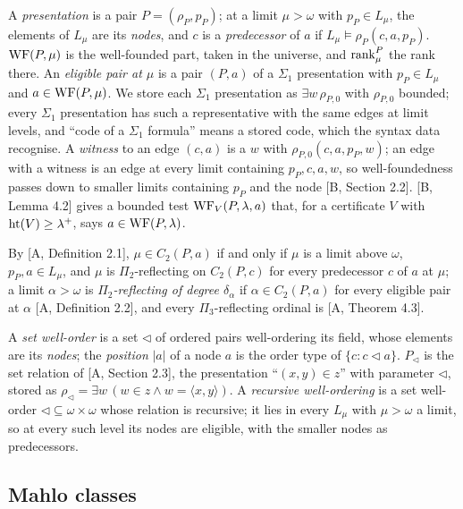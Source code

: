 \documentclass[11pt]{article}
\begin{document}
A \emph{presentation} is a pair $P = (\rho_P, p_P)$; at a limit $\mu > \omega$ with $p_P \in L_\mu$, the elements of
$L_\mu$ are its \emph{nodes}, and $c$ is a \emph{predecessor} of $a$ if $L_\mu \models \rho_P(c,a,p_P)$. $\mathrm{WF}(P,\mu)$ is
the well-founded part, taken in the universe, and $\mathrm{rank}^P_\mu$ the rank there. An \emph{eligible pair at $\mu$} is a
pair $(P,a)$ of a $\Sigma_1$ presentation with $p_P \in L_\mu$ and $a \in \mathrm{WF}(P,\mu)$. We store each $\Sigma_1$
presentation as $\exists w\, \rho_{P,0}$ with $\rho_{P,0}$ bounded; every $\Sigma_1$ presentation has such a
representative with the same edges at limit levels, and ``code of a $\Sigma_1$ formula'' means a stored code, which the
syntax data recognise. A \emph{witness} to an edge $(c,a)$ is a $w$ with $\rho_{P,0}(c,a,p_P,w)$; an edge with a
witness is an edge at every limit containing $p_P, c, a, w$, so well-foundedness passes down to smaller limits
containing $p_P$ and the node [B, Section 2.2]. [B, Lemma 4.2] gives a bounded test $\mathrm{WF}_V(P,\lambda,a)$ that, for a
certificate $V$ with $\mathrm{ht}(V) \ge \lambda^+$, says $a \in \mathrm{WF}(P,\lambda)$.

By [A, Definition 2.1], $\mu \in C_2(P,a)$ if and only if $\mu$ is a limit above $\omega$, $p_P, a \in L_\mu$, and $\mu$
is $\Pi_2$-reflecting on $C_2(P,c)$ for every predecessor $c$ of $a$ at $\mu$; a limit $\alpha > \omega$ is
\emph{$\Pi_2$-reflecting of degree $\delta_\alpha$} if $\alpha \in C_2(P,a)$ for every eligible pair at $\alpha$ [A, Definition 2.2], and every
$\Pi_3$-reflecting ordinal is [A, Theorem 4.3].

A \emph{set well-order} is a set $\lhd$ of ordered pairs well-ordering its field, whose elements are its
\emph{nodes}; the \emph{position} $|a|$ of a node $a$ is the order type of $\{c : c \lhd a\}$. $P_\lhd$ is the set
relation of [A, Section 2.3], the presentation ``$(x,y) \in z$'' with parameter $\lhd$, stored as $\rho_\lhd = \exists
w\, (w \in z \wedge w = \langle x,y\rangle)$. A \emph{recursive well-ordering} is a set well-order $\lhd \subseteq
\omega \times \omega$ whose relation is recursive; it lies in every $L_\mu$ with $\mu > \omega$
a limit, so at every such level its nodes are eligible, with the smaller nodes as predecessors.

\subsection{Mahlo classes}
\end{document}

